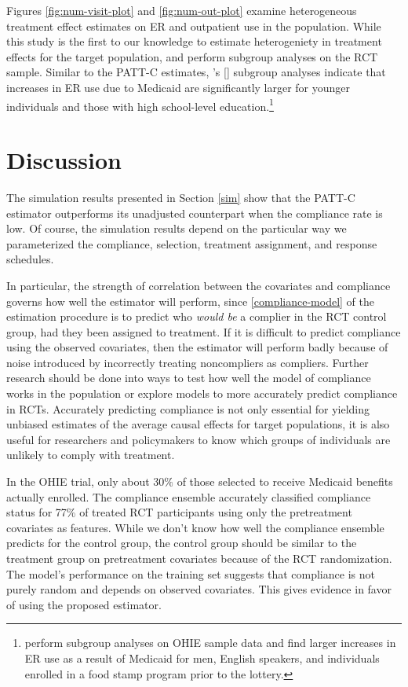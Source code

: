 \documentclass[hidelinks,12pt]{article}
\newcommand{\possessivecite}[1]{\citeauthor{#1}'s [\citeyear{#1}]}
\begin{document}
Figures \ref{fig:num-visit-plot} and \ref{fig:num-out-plot} examine heterogeneous treatment effect estimates on ER and outpatient use in the population. While this study is the first to our knowledge to estimate heterogeniety in treatment effects for the target population, \citet{Taubman} and \citet{NBERw22363} perform subgroup analyses on the RCT sample. Similar to the PATT-C estimates, \possessivecite{Taubman} subgroup analyses indicate that increases in ER use due to Medicaid are significantly larger for younger individuals and those with high school-level education.\footnote{\citet{NBERw22363} perform subgroup analyses on OHIE sample data and find larger increases in ER use as a result of Medicaid for men, English speakers, and individuals enrolled in a food stamp program prior to the lottery.}

\section{Discussion} \label{discussion}

The simulation results presented in Section \ref{sim} show that the PATT-C estimator outperforms its unadjusted counterpart when the compliance rate is low. Of course, the simulation results depend on the particular way we parameterized the compliance, selection, treatment assignment, and response schedules. 

In particular, the strength of correlation between the covariates and compliance governs how well the estimator will perform, since \ref{compliance-model} of the estimation procedure is to predict who \textit{would be} a complier in the RCT control group, had they been assigned to treatment. If it is difficult to predict compliance using the observed covariates, then the estimator will perform badly because of noise introduced by incorrectly treating noncompliers as compliers. Further research should be done into ways to test how well the model of compliance works in the population or explore models to more accurately predict compliance in RCTs.  Accurately predicting compliance is not only essential for yielding unbiased estimates of the average causal effects for target populations, it is also useful for researchers and policymakers to know which groups of individuals are unlikely to comply with treatment. 

In the OHIE trial, only about $30\%$ of those selected to receive Medicaid benefits actually enrolled. The compliance ensemble accurately classified compliance status for 77\% of treated RCT participants using only the pretreatment covariates as features. While we don't know how well the compliance ensemble predicts for the control group, the control group should be similar to the treatment group on pretreatment covariates because of the RCT randomization. The model's performance on the training set suggests that compliance is not purely random and depends on observed covariates. This gives evidence in favor of using the proposed estimator. 
\end{document}
